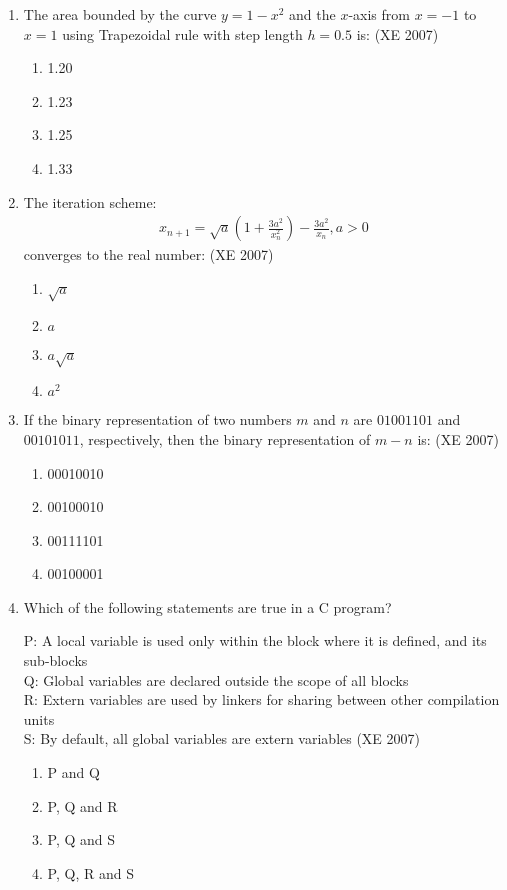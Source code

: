\documentclass[journal,12pt,onecolumn]{IEEEtran}
\theoremstyle{remark}
\begin{document}
\begin{enumerate}
    \item The area bounded by the curve $y = 1 - x^2$ and the $x$-axis from $x = -1$ to $x = 1$ using Trapezoidal rule with step length $h = 0.5$ is:
 \hfill{(XE 2007)}
    \begin{multicols}{4}
    \begin{enumerate}
        \item 1.20
        \item 1.23
        \item 1.25
        \item 1.33
    \end{enumerate}
\end{multicols}
    \item The iteration scheme:
    \begin{align}
    x_{n+1} = \sqrt{a} \left( 1 + \frac{3a^2}{x_n^2} \right) - \frac{3a^2}{x_n} , a > 0
    \end{align}
    converges to the real number:
 \hfill{(XE 2007)}
    \begin{multicols}{4}
    \begin{enumerate}
        \item $\sqrt{a}$
        \item $a$
        \item $a\sqrt{a}$
        \item $a^2$
    \end{enumerate}
\end{multicols}
    \item If the binary representation of two numbers $m$ and $n$ are $01001101$ and $00101011$, respectively, then the binary representation of $m - n$ is:
 \hfill{(XE 2007)}
    \begin{multicols}{4}
    \begin{enumerate}
        \item 00010010
        \item 00100010
        \item 00111101
        \item 00100001
    \end{enumerate}
\end{multicols}
    \item Which of the following statements are true in a C program?
    
         P: A local variable is used only within the block where it is defined, and its sub-blocks\\
         Q: Global variables are declared outside the scope of all blocks\\
         R: Extern variables are used by linkers for sharing between other compilation units\\
         S: By default, all global variables are extern variables
 \hfill{(XE 2007)}
    \begin{multicols}{4}
    \begin{enumerate}
        \item P and Q
        \item P, Q and R
        \item P, Q and S
        \item P, Q, R and S
    \end{enumerate}


\end{multicols}
\end{enumerate}
\end{document}
